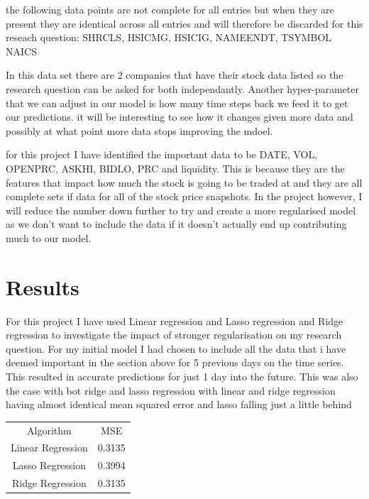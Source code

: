 \documentclass{report}
\begin{document}
the following data points are not complete for all entries but when they are present they are identical across all entries and will therefore be discarded for this reseach question: SHRCLS, HSICMG, HSICIG, NAMEENDT, TSYMBOL NAICS

In this data set there are 2 companies that have their stock data listed so the research question can be asked for both independantly. Another hyper-parameter that we can adjust in our model is how many time steps back we feed it to get our predictions. it will be interesting to see how it changes given more data and possibly at what point more data stops improving the mdoel.


for this project I have identified the important data to be DATE, VOL, OPENPRC, ASKHI, BIDLO, PRC and liquidity. This is because they are the features that impact how much the stock is going to be traded at and they are all complete sets if data for all of the stock price snapshots. In the project however, I will reduce the number down further to try and create a more regularised model as we don't want to include the data if it doesn't actually end up contributing much to our model.

\section{Results}

For this project I have used Linear regression and Lasso regression and Ridge regression to investigate the impact of stronger regularisation on my research question.
For my initial model I had chosen to include all the data that i have deemed important in the section above for 5 previous days on the time series. This resulted in accurate predictions for just 1 day into the future. This was also the case with bot ridge and lasso regression with linear and ridge regression having almost identical mean squared error and lasso falling just a little behind

\begin{minipage} {\linewidth}
\bigskip
\centering
{}
\begin{tabular}{c c}
    Algorithm & MSE \\
    Linear Regression & 0.3135 \\
    Lasso Regression & 0.3994 \\
    Ridge Regression & 0.3135
\end{tabular}
\bigskip
\end{minipage}
\end{document}
